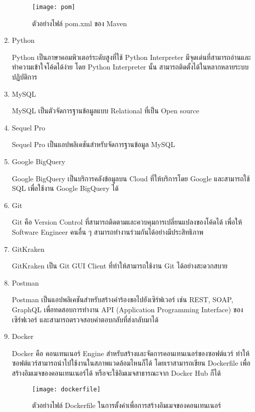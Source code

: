 \begin{enumerate}
	\begin{figure}[!h]
		\centering
		\texttt{[image: pom]}  
		\caption{ตัวอย่างไฟล์ pom.xml ของ Maven}
		\label{Fig:pom}
	\end{figure}
	
	\item Python
	
	Python เป็นภาษาคอมพิวเตอร์ระดับสูงที่ใช้ Python Interpreter มีจุดเด่นที่สามารถอ่านและทำความเข้าใจโค้ดได้ง่าย โดย Python Interpreter นั้น สามารถติดตั้งได้ในหลากหลายระบบปฏิบัติการ ~\cite{python}
		
	\item MySQL
	
	MySQL เป็นตัวจัดการฐานข้อมูลแบบ Relational ที่เป็น Open source ~\cite{mysql}

	\item Sequel Pro
	
	Sequel Pro เป็นแอปพลิเคชันสำหรับจัดการฐานข้อมูล MySQL ~\cite{sequelpro}
	
	\item Google BigQuery
	
	Google BigQuery เป็นบริการคลังข้อมูลบน Cloud ที่ให้บริการโดย Google และสามารถใช้ SQL เพื่อใช้งาน Google BigQuery ได้ ~\cite{bigquery}
	
	\item Git
	
	Git คือ Version Control ที่สามารถติดตามและควบคุมการเปลี่ยนแปลงของโค้ดได้ เพื่อให้ Software Engineer คนอื่น ๆ สามารถทำงานร่วมกันได้อย่างมีประสิทธิภาพ ~\cite{git}
	
	\item GitKraken
	
	GitKraken เป็น Git GUI Client ที่ทำให้สามารถใช้งาน Git ได้อย่างสะดวกสบาย ~\cite{gitkraken}

	\item Postman
	
	Postman เป็นแอปพลิเคชันสำหรับสร้างคำร้องขอไปยังเซิร์ฟเวอร์ เช่น REST, SOAP, GraphQL เพื่อทดสอบการทำงาน API (Application Programming Interface) ของเซิร์ฟเวอร์ และสามารถตรวจสอบคำตอบกลับที่ส่งกลับมาได้ ~\cite{postman}
	
	\item Docker
	
	Docker คือ คอนเทนเนอร์ Engine สำหรับสร้างและจัดการคอนเทนเนอร์ของซอฟต์แวร์ ทำให้ซอฟต์แวร์สามารถนำไปใช้งานในสภาพแวดล้อมไหนก็ได้ โดยเราสามารถเขียน Dockerfile เพื่อสร้างอิมเมจของคอนเทนเนอร์ได้ หรือจะใช้อิมเมจสาธารณะจาก Docker Hub ก็ได้ ~\cite{docker}
	
	\begin{figure}[!h]
		\centering
		\texttt{[image: dockerfile]}  
		\caption{ตัวอย่างไฟล์ Dockerfile ในการตั้งค่าเพื่อการสร้างอิมเมจของคอนเทนเนอร์}
		\label{Fig:dockerfile}
	\end{figure}
	

\end{enumerate}
